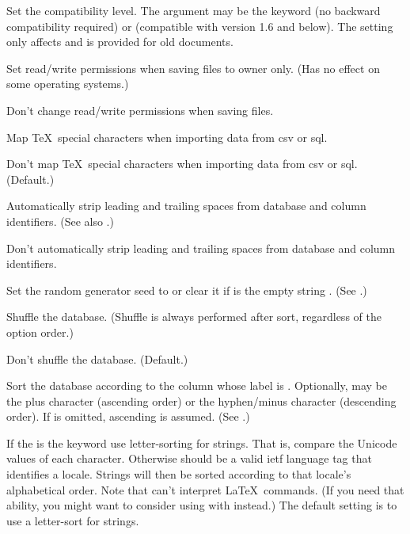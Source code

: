  
Set the compatibility level. The argument may be the keyword
 (no backward compatibility required) or 
(compatible with version 1.6 and below).  The  setting only affects  and is provided for old
documents.

Set read/write permissions when saving  files to owner only.
(Has no effect on some operating systems.)

Don't change read/write permissions when saving  files.

Map \TeX\ special characters when importing data from 
\gls{csv} or \gls{sql}.

Don't map \TeX\ special characters when importing data from
\gls{csv} or \gls{sql}. (Default.)

Automatically strip leading and trailing spaces from database 
and column identifiers. (See also .)

Don't automatically strip leading and trailing spaces from database 
and column identifiers.

Set the random generator seed to  or clear it
if  is the empty string . (See .)

Shuffle the database. (Shuffle is always performed after sort,
regardless of the option order.)

Don't shuffle the database. (Default.)

Sort the database according to the column whose label is
. Optionally,  may be the plus character
\qtt{+} (ascending order) or the hyphen\slash minus character
\qtt{-} (descending order).  If  is omitted, ascending
is assumed.  (See .)

If the  is the keyword  use letter-sorting
for strings. That is, compare the Unicode values of each character.
Otherwise  should be a valid \gls{ietf} 
language tag that identifies a locale. Strings will then be sorted 
according to that locale's alphabetical order. Note that  can't 
interpret \LaTeX\ commands. (If you need that ability, you might want 
to consider using  with  
instead.) The default setting is to use a letter-sort for strings.

